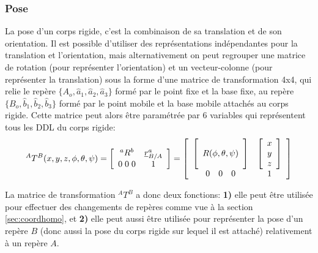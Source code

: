\subsubsection{Pose}

La pose d'un corps rigide, c'est la combinaison de sa translation et de son orientation. Il est possible d'utiliser des représentations indépendantes pour la translation et l'orientation, mais alternativement on peut regrouper une matrice de rotation (pour représenter l'orientation) et un vecteur-colonne (pour représenter la translation)  sous la forme d'une matrice de transformation 4x4,
qui relie le repère $\{A_o,\hat{a}_1,\hat{a}_2,\hat{a}_3\}$ formé par le point fixe et la base fixe, au repère $\{B_o,\hat{b}_1,\hat{b}_2,\hat{b}_3\}$ formé par le point mobile et la base mobile attachés au corps rigide. Cette matrice peut alors être paramétrée par 6 variables qui représentent tous les DDL du corps rigide:
\begin{equation}
	^{A}T^B(x,y,z,\phi,\theta,\psi) = \left[ \begin{array}{c c}
												 ^aR^b  & \underline{r}^a_{B/A} \\ 0 \; 0 \; 0 & 1
	\end{array}  \right] =
	\left[ \begin{array}{c c}
			   \left[ \begin{array}{c} \\  R(\phi,\theta,\psi) \\ \\ \end{array} \right] & \left[ \begin{array}{c} x \\ y \\ z \end{array} \right] \\  \begin{array}{ccc} 0 & 0 & 0 \end{array}   &  1
	\end{array}  \right]
\end{equation}

La matrice de transformation $^{A}T^B$ a donc deux fonctions: \textbf{1)} elle peut être utilisée pour effectuer des changements de repères comme vue à la section \ref{sec:coordhomo}, et \textbf{2)} elle peut aussi être utilisée pour représenter la pose d'un repère $B$ (donc aussi la pose du corps rigide sur lequel il est attaché) relativement à un repère $A$.


